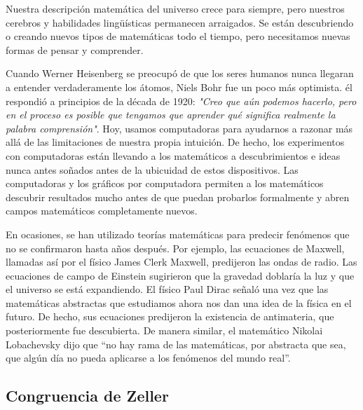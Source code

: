 \documentclass{article}
\begin{document}
Nuestra descripci\'on matem\'atica del universo crece para siempre, pero nuestros
cerebros y habilidades lingü\'isticas permanecen arraigados. Se est\'an descubriendo
o creando nuevos tipos de matem\'aticas todo el tiempo, pero necesitamos nuevas
formas de pensar y comprender. 

Cuando Werner Heisenberg se preocup\'o de que los seres humanos nunca llegaran a
entender verdaderamente los \'atomos, Niels Bohr fue un poco m\'as optimista. \'el
respondi\'o a principios de la d\'ecada de 1920: \textit{"Creo que a\'un podemos
hacerlo, pero en el proceso es posible que tengamos que aprender qu\'e significa
realmente la palabra comprensi\'on"}. Hoy, usamos computadoras para ayudarnos a
razonar m\'as all\'a de las limitaciones de nuestra propia intuici\'on. De hecho, los
experimentos con computadoras est\'an llevando a los matem\'aticos a descubrimientos
e ideas nunca antes so\~nados antes de la ubicuidad de estos dispositivos. Las
computadoras y los gr\'aficos por computadora permiten a los matem\'aticos descubrir
resultados mucho antes de que puedan probarlos formalmente y abren campos
matem\'aticos completamente nuevos. 

En ocasiones, se han utilizado teor\'ias matem\'aticas para predecir fen\'omenos que
no se confirmaron hasta a\~nos despu\'es. Por ejemplo, las ecuaciones de Maxwell,
llamadas as\'i por el f\'isico James Clerk Maxwell, predijeron las ondas de radio.
Las ecuaciones de campo de Einstein sugirieron que la gravedad doblar\'ia la luz y
que el universo se est\'a expandiendo. El f\'isico Paul Dirac se\~nal\'o una vez que las
matem\'aticas abstractas que estudiamos ahora nos dan una idea de la f\'isica en el
futuro. De hecho, sus ecuaciones predijeron la existencia de antimateria, que
posteriormente fue descubierta. De manera similar, el matem\'atico Nikolai
Lobachevsky dijo que “no hay rama de las matem\'aticas, por abstracta que sea, que
alg\'un d\'ia no pueda aplicarse a los fen\'omenos del mundo real”.


\subsection{Congruencia de Zeller}

%    





\pagebreak
 

\end{document}
